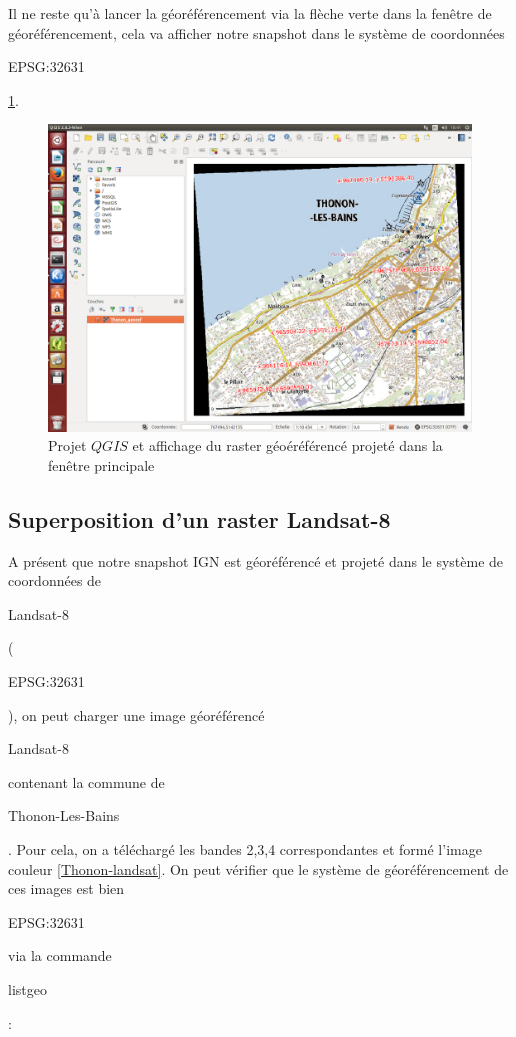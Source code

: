 \documentclass{book}
\begin{document}
Il ne reste qu'à lancer la géoréférencement via la flèche verte dans la fen\^{e}tre de géoréférencement, cela va afficher
notre snapshot dans le système de coordonnées \begin{itshape}EPSG:32631\end{itshape} \ref{qgis-resultat}.

\begin{figure}[!h]
\begin{center}
\includegraphics[scale=0.3]{images/georeferencing/qgis-resultat.png}
\end{center}
\caption{Projet $QGIS$ et affichage du raster géoéréférencé projeté dans la fen\^{e}tre principale}
\label{qgis-resultat}
\end{figure}

\subsection{Superposition d'un raster Landsat-8}

A présent que notre snapshot IGN est géoréférencé et projeté dans le système de coordonnées de \begin{itshape}Landsat-8\end{itshape}
(\begin{itshape}EPSG:32631\end{itshape}), on peut charger une image géoréférencé \begin{itshape}Landsat-8\end{itshape} contenant la 
commune de \begin{itshape}Thonon-Les-Bains\end{itshape}. Pour cela, on a téléchargé les bandes 2,3,4 correspondantes et formé l'image 
couleur  \ref{Thonon-landsat}. On peut vérifier que le système de géoréférencement de ces images est bien \begin{itshape}EPSG:32631\end{itshape} via la 
commande \begin{itshape}listgeo\end{itshape}:\\
\end{document}
